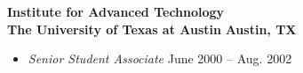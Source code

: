 \textbf{Institute for Advanced Technology}\\
\textbf{The University of Texas at Austin} \hfill \textbf{Austin, TX}
\begin{itemize}
\item[] \textit{Senior Student Associate}%
        \hfill June 2000 -- Aug. 2002

\end{itemize}
